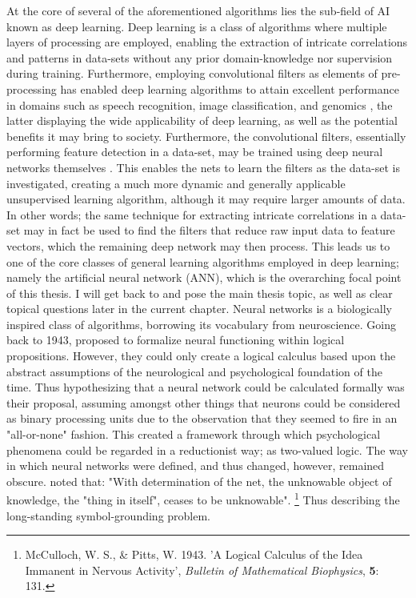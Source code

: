 At the core of several of the aforementioned algorithms lies the sub-field of AI known as deep learning. Deep learning is a class of algorithms where multiple layers of processing are employed, enabling the extraction of intricate correlations and patterns in data-sets without any prior domain-knowledge nor supervision during training. Furthermore, employing convolutional filters as elements of pre-processing has enabled deep learning algorithms to attain excellent performance in domains such as speech recognition, image classification, and genomics \citep{LeCun2015}, the latter displaying the wide applicability of deep learning, as well as the potential benefits it may bring to society. Furthermore, the convolutional filters, essentially performing feature detection in a data-set, may be trained using deep neural networks themselves \citep{LeCun2015}. This enables the nets to learn the filters as the data-set is investigated, creating a much more dynamic and generally applicable unsupervised learning algorithm, although it may require larger amounts of data. In other words; the same technique for extracting intricate correlations in a data-set may in fact be used to find the filters that reduce raw input data to feature vectors, which the remaining deep network may then process. This leads us to one of the core classes of general learning algorithms employed in deep learning; namely the artificial neural network (ANN), which is the overarching focal point of this thesis. I will get back to and pose the main thesis topic, as well as clear topical questions later in the current chapter.
Neural networks is a biologically inspired class of algorithms, borrowing its vocabulary from neuroscience. Going back to 1943, \cite{McCulloch1943} proposed to formalize neural functioning within logical propositions.
However, they could only create a logical calculus based upon the abstract assumptions of the neurological and psychological foundation of the time. Thus hypothesizing that a neural network could be calculated formally was their proposal, assuming amongst other things that neurons could be considered as binary processing units due to the observation that they seemed to fire in an "all-or-none" fashion. This created a framework through which psychological phenomena could be regarded in a reductionist way; as two-valued logic. The way in which neural networks were defined, and thus changed, however, remained obscure. \cite{McCulloch1943} noted that: "With determination of the net, the unknowable object of knowledge, the "thing in itself", ceases to be unknowable".
\footnote{McCulloch, W. S., \& Pitts, W. 1943. 'A Logical Calculus of the Idea Immanent in Nervous Activity', \textit{Bulletin of Mathematical Biophysics}, \textbf{5}: 131.}
Thus describing the long-standing symbol-grounding problem.

